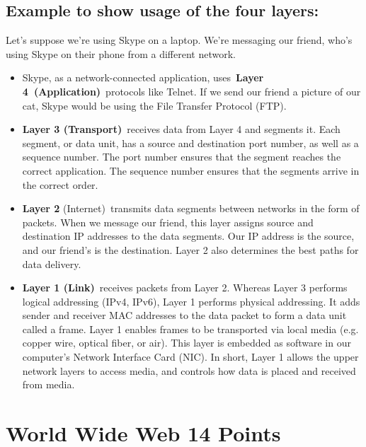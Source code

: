 \documentclass{resources/WeSTassignment}
\begin{document}
\begin{enumerate}
\subsection{Example to show usage of the four layers:}
Let’s suppose we’re using Skype on a laptop. We’re messaging our friend, who’s using Skype on their phone from a different network.
\begin{itemize}
	\item Skype, as a network-connected application, uses \textbf{Layer 4 (Application)} protocols like Telnet. If we send our friend a picture of our cat, Skype would be using the File Transfer Protocol (FTP).
	\item \textbf{Layer 3 (Transport)} receives data from Layer 4 and segments it. Each segment, or data unit, has a source and destination port number, as well as a sequence number. The port number ensures that the segment reaches the correct application. The sequence number ensures that the segments arrive in the correct order.
	\item \textbf{Layer 2} (Internet) transmits data segments between networks in the form of packets. When we message our friend, this layer assigns source and destination IP addresses to the data segments. Our IP address is the source, and our friend’s is the destination. Layer 2 also determines the best paths for data delivery.
	\item \textbf{Layer 1 (Link)} receives packets from Layer 2. Whereas Layer 3 performs logical addressing (IPv4, IPv6), Layer 1 performs physical addressing. It adds sender and receiver MAC addresses to the data packet to form a data unit called a frame. Layer 1 enables frames to be transported via local media (e.g. copper wire, optical fiber, or air). This layer is embedded as software in our computer’s Network Interface Card (NIC). In short, Layer 1 allows the upper network layers to access media, and controls how data is placed and received from media.
\end{itemize}

\section{World Wide Web \hfill{14 Points}}

\end{enumerate}
\end{document}
